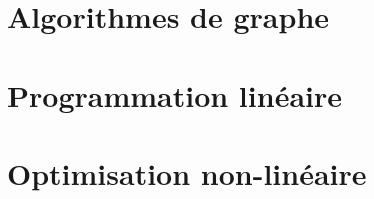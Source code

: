 \section{Algorithmes de graphe}


\section{Programmation linéaire}


\section{Optimisation non-linéaire}
